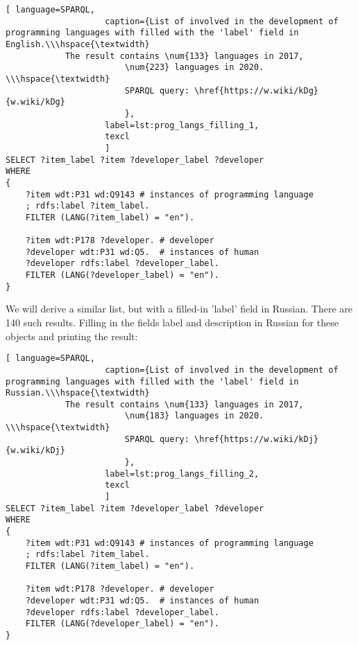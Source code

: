 \begin{lstlisting}[ language=SPARQL, 
                    caption={List of involved in the development of programming languages with filled with the 'label' field in English.\\\hspace{\textwidth}
			The result contains \num{133} languages in 2017, 
                        \num{223} languages in 2020. \\\hspace{\textwidth}
                        SPARQL query: \href{https://w.wiki/kDg}{w.wiki/kDg}
                        },
                    label=lst:prog_langs_filling_1,
                    texcl 
                    ]
SELECT ?item_label ?item ?developer_label ?developer
WHERE
{
    ?item wdt:P31 wd:Q9143 # instances of programming language
    ; rdfs:label ?item_label. 
    FILTER (LANG(?item_label) = "en"). 

    ?item wdt:P178 ?developer. # developer 
    ?developer wdt:P31 wd:Q5.  # instances of human
    ?developer rdfs:label ?developer_label. 
    FILTER (LANG(?developer_label) = "en").  
}
\end{lstlisting}%

We will derive a similar list, but with a filled-in 'label' field in Russian. There are 140 such results. Filling in the fields label and description in Russian for these objects and printing the result:

\begin{lstlisting}[ language=SPARQL, 
                    caption={List of involved in the development of programming languages with filled with the 'label' field in Russian.\\\hspace{\textwidth}
			The result contains \num{133} languages in 2017, 
                        \num{183} languages in 2020. \\\hspace{\textwidth}
                        SPARQL query: \href{https://w.wiki/kDj}{w.wiki/kDj}
                        },
                    label=lst:prog_langs_filling_2,
                    texcl 
                    ]
SELECT ?item_label ?item ?developer_label ?developer
WHERE
{
    ?item wdt:P31 wd:Q9143 # instances of programming language
    ; rdfs:label ?item_label. 
    FILTER (LANG(?item_label) = "en"). 

    ?item wdt:P178 ?developer. # developer 
    ?developer wdt:P31 wd:Q5.  # instances of human
    ?developer rdfs:label ?developer_label. 
    FILTER (LANG(?developer_label) = "en").  
}
\end{lstlisting}%

